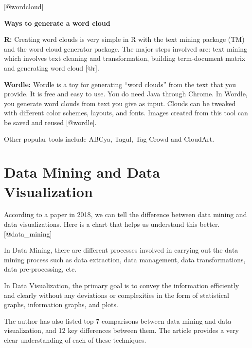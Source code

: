 \documentclass[]{book}
\theoremstyle{definition}
\theoremstyle{definition}
\theoremstyle{definition}
\theoremstyle{remark}
\begin{document}
{[}@wordcloud{]}

\textbf{Ways to generate a word cloud}

\textbf{R:} Creating word clouds is very simple in R with the text
mining package (TM) and the word cloud generator package. The major
steps involved are: text mining which involves text cleaning and
transformation, building term-document matrix and generating word cloud
{[}@r{]}.

\textbf{Wordle:} Wordle is a toy for generating ``word clouds'' from the
text that you provide. It is free and easy to use. You do need Java
through Chrome. In Wordle, you generate word clouds from text you give
as input. Clouds can be tweaked with different color schemes, layouts,
and fonts. Images created from this tool can be saved and reused
{[}@wordle{]}.

Other popular tools include ABCya, Tagul, Tag Crowd and CloudArt.

\section{Data Mining and Data
Visualization}\label{data-mining-and-data-visualization}

According to a paper in 2018, we can tell the difference between data
mining and data visualizations. Here is a chart that helps us understand
this better. {[}@data\_mining{]}

In Data Mining, there are different processes involved in carrying out
the data mining process such as data extraction, data management, data
transformations, data pre-processing, etc.

In Data Visualization, the primary goal is to convey the information
efficiently and clearly without any deviations or complexities in the
form of statistical graphs, information graphs, and plots.

The author has also listed top 7 comparisons between data mining and
data visualization, and 12 key differences between them. The article
provides a very clear understanding of each of these techniques.
\end{document}
